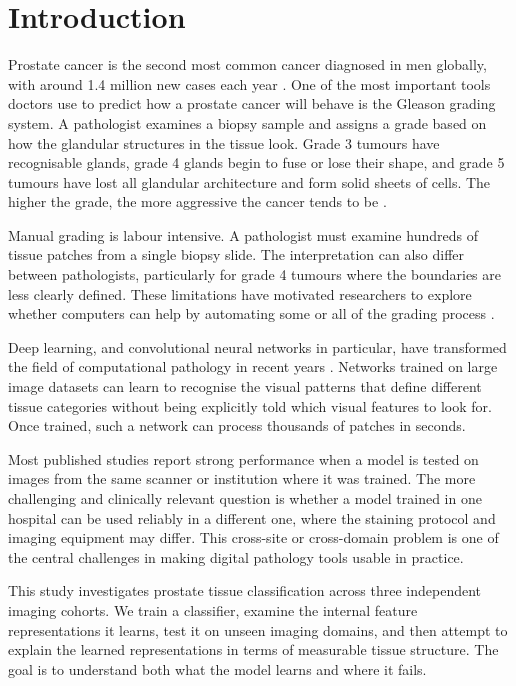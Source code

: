\documentclass[12pt, a4paper]{article}
\begin{document}
\tableofcontents
\newpage

\section{Introduction}

Prostate cancer is the second most common cancer diagnosed in men globally, with
around 1.4 million new cases each year \citep{campanella2019}. One of the most
important tools doctors use to predict how a prostate cancer will behave is the
Gleason grading system. A pathologist examines a biopsy sample and assigns a grade
based on how the glandular structures in the tissue look. Grade 3 tumours have
recognisable glands, grade 4 glands begin to fuse or lose their shape, and grade
5 tumours have lost all glandular architecture and form solid sheets of cells. The
higher the grade, the more aggressive the cancer tends to be \citep{epstein2016}.

Manual grading is labour intensive. A pathologist must examine hundreds of tissue
patches from a single biopsy slide. The interpretation can also differ between
pathologists, particularly for grade 4 tumours where the boundaries are less
clearly defined. These limitations have motivated researchers to explore whether
computers can help by automating some or all of the grading process \citep{litjens2017}.

Deep learning, and convolutional neural networks in particular, have transformed
the field of computational pathology in recent years \citep{kather2020}. Networks
trained on large image datasets can learn to recognise the visual patterns that
define different tissue categories without being explicitly told which visual
features to look for. Once trained, such a network can process thousands of patches
in seconds.

Most published studies report strong performance when a model is tested on images
from the same scanner or institution where it was trained. The more challenging
and clinically relevant question is whether a model trained in one hospital can be
used reliably in a different one, where the staining protocol and imaging equipment
may differ. This cross-site or cross-domain problem is one of the central challenges
in making digital pathology tools usable in practice.

This study investigates prostate tissue classification across three independent
imaging cohorts. We train a classifier, examine the internal feature representations
it learns, test it on unseen imaging domains, and then attempt to explain the learned
representations in terms of measurable tissue structure. The goal is to understand
both what the model learns and where it fails.
\end{document}
